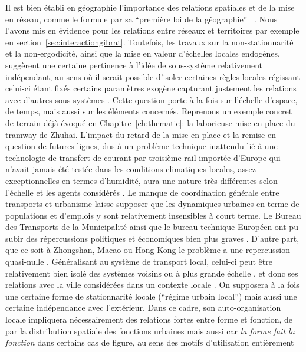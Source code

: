 Il est bien établi en géographie l'importance des relations spatiales et de la mise en réseau, comme le formule  par sa ``première loi de la géographie''~\cite{tobler2004first} . Nous l'avons mis en évidence pour les relations entre réseaux et territoires par exemple en section~\ref{sec:interactiongibrat}. Toutefois, les travaux sur la non-stationnarité et la non-ergodicité, ainsi que la mise en valeur d'échelles locales endogènes, suggèrent une certaine pertinence à l'idée de sous-système relativement indépendant, au sens où il serait possible d'isoler certaines règles locales régissant celui-ci étant fixés certains paramètres exogène capturant justement les relations avec d'autres sous-systèmes . Cette question porte à la fois sur l'échelle d'espace, de temps, mais aussi sur les éléments concernés. Reprenons un exemple concret de terrain déjà évoqué en Chapitre~\ref{ch:thematic}: la laborieuse mise en place du tramway de Zhuhai. L'impact du retard de la mise en place et la remise en question de futures lignes, dus à un problème technique inattendu lié à une technologie de transfert de courant par troisième rail importée d'Europe qui n'avait jamais été testée dans les conditions climatiques locales, assez exceptionnelles en termes d'humidité, aura une nature très différentes selon l'échelle et les agents considérés . Le manque de coordination générale entre transports et urbanisme laisse supposer que les dynamiques urbaines en terme de populations et d'emplois y sont relativement insensibles à court terme. Le Bureau des Transports de la Municipalité ainsi que le bureau technique Européen ont pu subir des répercussions politiques et économiques bien plus graves\comment[FL]{$\sim$} . D'autre part, que ce soit à Zhongshan, Macao ou Hong-Kong le problème a une repercussion quasi-nulle . Généralisant au système de transport local, celui-ci peut être relativement bien isolé des systèmes voisins ou à plus grande échelle , et donc ses relations avec la ville considérées  dans un contexte locale . On supposera à la fois une certaine forme de stationnarité locale (``régime urbain local'') mais aussi une certaine indépendance avec l'extérieur. Dans ce cadre, son auto-organisation locale impliquera nécessairement des relations fortes entre forme et fonction, de par la distribution spatiale des fonctions urbaines mais aussi car \emph{la forme fait la fonction} dans certains cas de figure, au sens des motifs d'utilisation entièrement 
